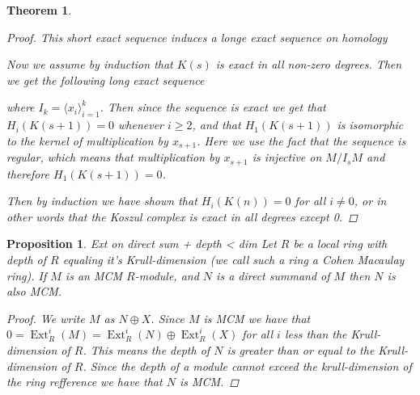\documentclass[11pt, a4paper, english]{article}
\newtheorem{prop}{Proposition}
\numberwithin{prop}{section}
\numberwithin{lemma}{section}
\newtheorem{theorem}{Theorem}
\numberwithin{theorem}{section}
\numberwithin{defin}{section}
\numberwithin{example}{section}
\DeclareMathOperator{\Ext}{Ext}
\begin{document}
\begin{theorem}
\begin{proof}
This short exact sequence induces a longe exact sequence on homology
\begin{center}
\end{center}
Now we assume by induction that $K(s)$ is exact in all non-zero degrees. Then we get the following long exact sequence
\begin{center}
\end{center}
where $I_k = \langle x_i \rangle_{i=1}^k$. Then since the sequence is exact we get that $H_i(K(s+1)) = 0$ whenever $i \geq 2$, and that $H_1(K(s+1))$ is isomorphic to the kernel of multiplication by $x_{s+1}$. Here we use the fact that the sequence is regular, which means that multiplication by $x_{s+1}$ is injective on $M/I_sM$ and therefore $H_1(K(s+1)) = 0$.

Then by induction we have shown that $H_i(K(n)) = 0$ for all $i \neq 0$, or in other words that the Koszul complex is exact in all degrees except 0.
\end{proof}
\end{theorem}
\fi

\begin{prop}
{\color{red} Ext on direct sum + depth < dim}
Let $R$ be a local ring with depth of $R$ equaling it's Krull-dimension (we call such a ring a Cohen Macaulay ring). If $M$ is an MCM $R$-module, and $N$ is a direct summand of $M$ then $N$ is also MCM.
\begin{proof}
We write $M$ as $N \oplus X$. Since $M$ is MCM we have that $0 = \Ext^i_R(M) = \Ext^i_R(N) \oplus \Ext^i_R(X)$ for all $i$ less than the Krull-dimension of $R$. This means the depth of $N$ is greater than or equal to the Krull-dimension of $R$. Since the depth of a module cannot exceed the krull-dimension of the ring {\color{red} refference} we have that $N$ is MCM.
\end{proof}
\end{prop}
\end{document}

